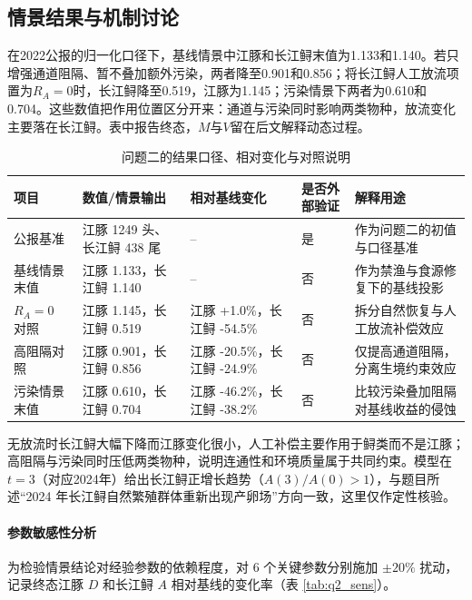 \documentclass{MMCStyle}
\begin{document}
\subsection{情景结果与机制讨论}
在2022公报的归一化口径下，基线情景中江豚和长江鲟末值为1.133和1.140。若只增强通道阻隔、暂不叠加额外污染，两者降至0.901和0.856；将长江鲟人工放流项置为$R_A=0$时，长江鲟降至0.519，江豚为1.145；污染情景下两者为0.610和0.704。这些数值把作用位置区分开来：通道与污染同时影响两类物种，放流变化主要落在长江鲟。表中报告终态，$M$与$V$留在后文解释动态过程。
\begin{table}[htbp]
\centering
\caption{问题二的结果口径、相对变化与对照说明}
\label{tab:q2_result}
\begin{tabularx}{0.95\textwidth}{>{\raggedright\arraybackslash}p{2.2cm} >{\raggedright\arraybackslash}p{3.6cm} >{\raggedright\arraybackslash}p{2.8cm} >{\raggedright\arraybackslash}p{1.7cm} X}
\toprule
项目 & 数值/情景输出 & 相对基线变化 & 是否外部验证 & 解释用途 \\
\midrule
2022 公报基准 & 江豚 1249 头、长江鲟 438 尾 & -- & 是 & 作为问题二的初值与口径基准 \\
基线情景末值 & 江豚 1.133，长江鲟 1.140 & -- & 否 & 作为禁渔与食源修复下的基线投影 \\
$R_A=0$ 对照 & 江豚 1.145，长江鲟 0.519 & 江豚 +1.0\%，长江鲟 -54.5\% & 否 & 拆分自然恢复与人工放流补偿效应 \\
高阻隔对照 & 江豚 0.901，长江鲟 0.856 & 江豚 -20.5\%，长江鲟 -24.9\% & 否 & 仅提高通道阻隔，分离生境约束效应 \\
污染情景末值 & 江豚 0.610，长江鲟 0.704 & 江豚 -46.2\%，长江鲟 -38.2\% & 否 & 比较污染叠加阻隔对基线收益的侵蚀 \\
\bottomrule
\end{tabularx}
\end{table}
无放流时长江鲟大幅下降而江豚变化很小，人工补偿主要作用于鲟类而不是江豚；高阻隔与污染同时压低两类物种，说明连通性和环境质量属于共同约束。模型在$t=3$（对应2024年）给出长江鲟正增长趋势（$A(3)/A(0)>1$），与题目所述“2024 年长江鲟自然繁殖群体重新出现产卵场”方向一致，这里仅作定性核验。

\paragraph{参数敏感性分析}
为检验情景结论对经验参数的依赖程度，对 6 个关键参数分别施加 $\pm 20\%$ 扰动，记录终态江豚 $D$ 和长江鲟 $A$ 相对基线的变化率（表 \ref{tab:q2_sens}）。
\end{document}
